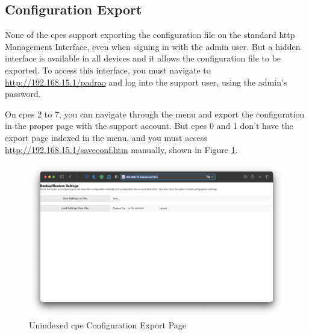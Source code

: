 \subsection{Configuration Export}

None of the \glspl{cpe} support exporting the configuration file on the standard \gls{http} Management Interface, even when signing in with the admin user. But a hidden interface is available in all devices and it allows the configuration file to be exported. To access this interface, you must navigate to \url{http://192.168.15.1/padrao} and log into the support user, using the admin’s password.

On \glspl{cpe} 2 to 7, you can navigate through the menu and export the configuration in the proper page with the support account. But \glspl{cpe} 0 and 1 don’t have the export page indexed in the menu, and you must access \url{http://192.168.15.1/saveconf.htm} manually, shown in Figure \ref{figure:cpe_saveconf}.

\begin{figure}[h]
    \centering
    \includegraphics[width=\linewidth]{contents/cpes-and-research-data/configuration-export/cpe-saveconf.png}
    \caption{Unindexed \gls{cpe} Configuration Export Page}
    \label{figure:cpe_saveconf}
\end{figure}

\FloatBarrier
